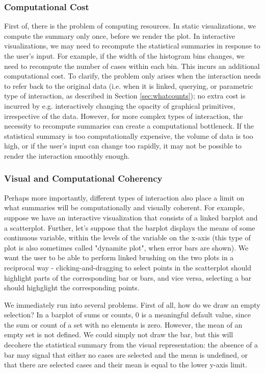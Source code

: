 \documentclass[12pt,a4paper]{article}
\begin{document}
\subsubsection{Computational Cost}

First of, there is the problem of computing resources. In static visualizations, we compute the summary only once, before we render the plot. In interactive visualizations, we may need to recompute the statistical summaries in response to the user's input. For example, if the width of the histogram bins changes, we need to recompute the number of cases within each bin. This incurs an additional computational cost. To clarify, the problem only arises when the interaction needs to refer back to the original data (i.e. when it is linked, querying, or parametric type of interaction, as described in Section \ref{sec:whatcounts}); no extra cost is incurred by e.g. interactively changing the opacity of graphical primitives, irrespective of the data. However, for more complex types of interaction, the necessity to recompute summaries can create a computational bottleneck. If the statistical summary is too computationally expensive, the volume of data is too high, or if the user's input can change too rapidly, it may not be possible to render the interaction smoothly enough.  

\subsubsection{Visual and Computational Coherency}

Perhaps more importantly, different types of interaction also place a limit on what summaries will be computationally and visually coherent. For example, suppose we have an interactive visualization that consists of a linked barplot and a scatterplot. Further, let's suppose that the barplot displays the means of some continuous variable, within the levels of the variable on the x-axis (this type of plot is also sometimes called "dynamite plot", when error bars are shown). We want the user to be able to perform linked brushing on the two plots in a reciprocal way - clicking-and-dragging to select points in the scatterplot should highlight parts of the corresponding bar or bars, and vice versa, selecting a bar should highglight the corresponding points.

We immediately run into several problems. First of all, how do we draw an empty selection? In a barplot of sums or counts, 0 is a meaningful default value, since the sum or count of a set with no elements is zero. However, the mean of an empty set is not defined. We could simply not draw the bar, but this will decohere the statistical summary from the visual representation: the absence of a bar may signal that either no cases are selected and the mean is undefined, or that there are selected cases and their mean is equal to the lower y-axis limit. 
\end{document}
